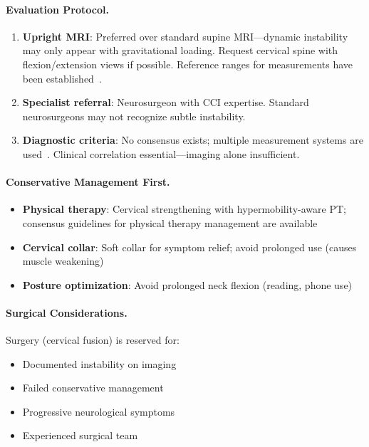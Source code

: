 \paragraph{Evaluation Protocol.}
\begin{enumerate}
    \item \textbf{Upright MRI}: Preferred over standard supine MRI—dynamic instability may only appear with gravitational loading. Request cervical spine with flexion/extension views if possible. Reference ranges for measurements have been established~\cite{Nicholson2023}.
    \item \textbf{Specialist referral}: Neurosurgeon with CCI expertise. Standard neurosurgeons may not recognize subtle instability.
    \item \textbf{Diagnostic criteria}: No consensus exists; multiple measurement systems are used~\cite{Lohkamp2022}. Clinical correlation essential—imaging alone insufficient.
\end{enumerate}

\paragraph{Conservative Management First.}
\begin{itemize}
    \item \textbf{Physical therapy}: Cervical strengthening with hypermobility-aware PT; consensus guidelines for physical therapy management are available~\cite{Russek2023}
    \item \textbf{Cervical collar}: Soft collar for symptom relief; avoid prolonged use (causes muscle weakening)
    \item \textbf{Posture optimization}: Avoid prolonged neck flexion (reading, phone use)
\end{itemize}

\paragraph{Surgical Considerations.}
Surgery (cervical fusion) is reserved for:
\begin{itemize}
    \item Documented instability on imaging
    \item Failed conservative management
    \item Progressive neurological symptoms
    \item Experienced surgical team
\end{itemize}

